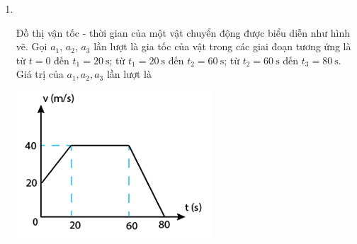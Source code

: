 \begin{enumerate}[label=\bfseries Câu \arabic*:,leftmargin=1.5cm]
\item {}\\
{		Đồ thị vận tốc - thời gian của một vật chuyển động được biểu diễn như hình vẽ. Gọi $a_1$, $a_2$, $a_3$ lần lượt là gia tốc của vật trong các giai đoạn tương ứng là từ $t = 0$ đến $t_1 = \SI{20}{\second}$; từ $t_1 =\SI{20}{\second}$ đến $t_2 =\SI{60}{\second}$; từ $t_2 = \SI{60}{\second}$ đến $t_3 = \SI{80}{\second}$. Giá trị của $a_1, a_2, a_3$ lần lượt là
	\begin{center}
		\includegraphics[width=0.35\linewidth]{../figs/VN10-2022-PH-TP008-P-5}
	\end{center}
}


\end{enumerate}
